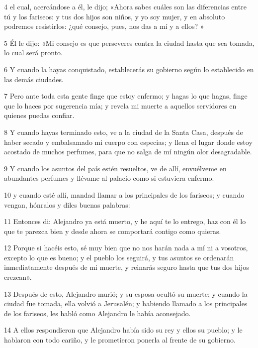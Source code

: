\par 4 el cual, acercándose a él, le dijo; «Ahora sabes cuáles son las diferencias entre tú y los fariseos: y tus dos hijos son niños, y yo soy mujer, y en absoluto podremos resistirlos: ¿qué consejo, pues, nos das a mí y a ellos? »

\par 5 Él le dijo: «Mi consejo es que perseveres contra la ciudad hasta que sea tomada, lo cual será pronto.

\par 6 Y cuando la hayas conquistado, establecerás su gobierno según lo establecido en las demás ciudades.

\par 7 Pero ante toda esta gente finge que estoy enfermo; y hagas lo que hagas, finge que lo haces por sugerencia mía; y revela mi muerte a aquellos servidores en quienes puedas confiar.

\par 8 Y cuando hayas terminado esto, ve a la ciudad de la Santa Casa, después de haber secado y embalsamado mi cuerpo con especias; y llena el lugar donde estoy acostado de muchos perfumes, para que no salga de mí ningún olor desagradable.

\par 9 Y cuando los asuntos del país estén resueltos, ve de allí, envuélveme en abundantes perfumes y llévame al palacio como si estuviera enfermo.

\par 10 y cuando esté allí, mandad llamar a los principales de los fariseos; y cuando vengan, hónralos y diles buenas palabras:

\par 11 Entonces di: Alejandro ya está muerto, y he aquí te lo entrego, haz con él lo que te parezca bien y desde ahora se comportará contigo como quieras.

\par 12 Porque si hacéis esto, sé muy bien que no nos harán nada a mí ni a vosotros, excepto lo que es bueno; y el pueblo los seguirá, y tus asuntos se ordenarán inmediatamente después de mi muerte, y reinarás seguro hasta que tus dos hijos crezcan».

\par 13 Después de esto, Alejandro murió; y su esposa ocultó su muerte; y cuando la ciudad fue tomada, ella volvió a Jerusalén; y habiendo llamado a los principales de los fariseos, les habló como Alejandro le había aconsejado.

\par 14 A ellos respondieron que Alejandro había sido su rey y ellos su pueblo; y le hablaron con todo cariño, y le prometieron ponerla al frente de su gobierno.

